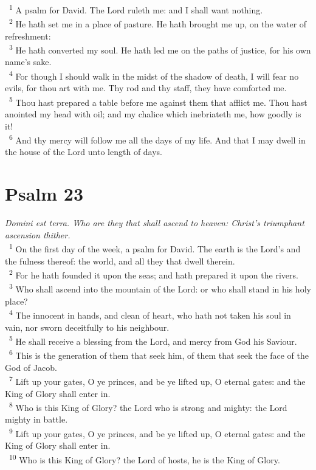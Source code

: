 \documentclass[a5paper,12pt]{article}
\begin{document}
\begin{multicols*}{2}
~\textsuperscript{1} A psalm for David. The Lord ruleth me: and I shall want nothing.\\
~\textsuperscript{2} He hath set me in a place of pasture. He hath brought me up, on the water of refreshment:\\
~\textsuperscript{3} He hath converted my soul. He hath led me on the paths of justice, for his own name's sake.\\
~\textsuperscript{4} For though I should walk in the midst of the shadow of death, I will fear no evils, for thou art with me. Thy rod and thy staff, they have comforted me.\\
~\textsuperscript{5} Thou hast prepared a table before me against them that afflict me. Thou hast anointed my head with oil; and my chalice which inebriateth me, how goodly is it!\\
~\textsuperscript{6} And thy mercy will follow me all the days of my life. And that I may dwell in the house of the Lord unto length of days.\\

\section{Psalm 23}
\label{sec:orgc5ec131}
\emph{Domini est terra. Who are they that shall ascend to heaven: Christ's triumphant ascension thither.}\\

~\textsuperscript{1} On the first day of the week, a psalm for David. The earth is the Lord's and the fulness thereof: the world, and all they that dwell therein.\\
~\textsuperscript{2} For he hath founded it upon the seas; and hath prepared it upon the rivers.\\
~\textsuperscript{3} Who shall ascend into the mountain of the Lord: or who shall stand in his holy place?\\
~\textsuperscript{4} The innocent in hands, and clean of heart, who hath not taken his soul in vain, nor sworn deceitfully to his neighbour.\\
~\textsuperscript{5} He shall receive a blessing from the Lord, and mercy from God his Saviour.\\
~\textsuperscript{6} This is the generation of them that seek him, of them that seek the face of the God of Jacob.\\
~\textsuperscript{7} Lift up your gates, O ye princes, and be ye lifted up, O eternal gates: and the King of Glory shall enter in.\\
~\textsuperscript{8} Who is this King of Glory? the Lord who is strong and mighty: the Lord mighty in battle.\\
~\textsuperscript{9} Lift up your gates, O ye princes, and be ye lifted up, O eternal gates: and the King of Glory shall enter in.\\
~\textsuperscript{10} Who is this King of Glory? the Lord of hosts, he is the King of Glory.\\


\end{multicols*}
\end{document}
